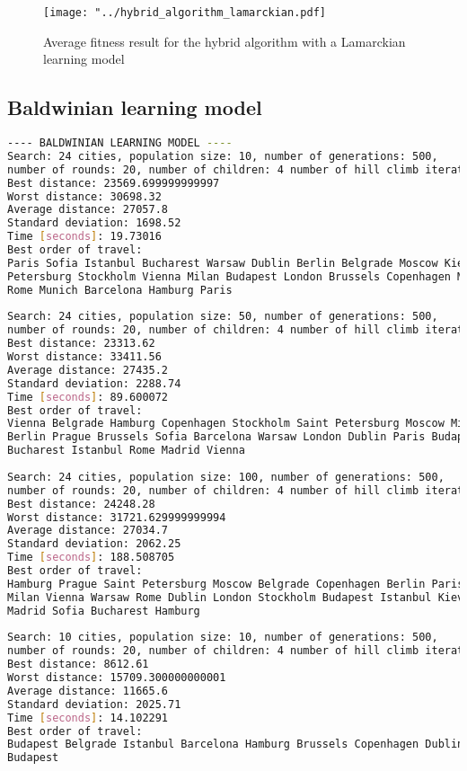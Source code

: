 \documentclass{article}
\begin{document}
\begin{figure}[H]
\begin{center}
\texttt{[image: "../hybrid\_algorithm\_lamarckian.pdf]}
\caption{Average fitness result for the hybrid algorithm with a Lamarckian learning model}
\end{center}
\end{figure}

\subsection{Baldwinian learning model}
\begin{lstlisting}[language=bash]
---- BALDWINIAN LEARNING MODEL ----
Search: 24 cities, population size: 10, number of generations: 500, 
number of rounds: 20, number of children: 4 number of hill climb iterations: 3: 
Best distance: 23569.699999999997
Worst distance: 30698.32
Average distance: 27057.8
Standard deviation: 1698.52
Time [seconds]: 19.73016
Best order of travel: 
Paris Sofia Istanbul Bucharest Warsaw Dublin Berlin Belgrade Moscow Kiev Saint 
Petersburg Stockholm Vienna Milan Budapest London Brussels Copenhagen Madrid 
Rome Munich Barcelona Hamburg Paris
 
Search: 24 cities, population size: 50, number of generations: 500, 
number of rounds: 20, number of children: 4 number of hill climb iterations: 3: 
Best distance: 23313.62
Worst distance: 33411.56
Average distance: 27435.2
Standard deviation: 2288.74
Time [seconds]: 89.600072
Best order of travel: 
Vienna Belgrade Hamburg Copenhagen Stockholm Saint Petersburg Moscow Milan Kiev 
Berlin Prague Brussels Sofia Barcelona Warsaw London Dublin Paris Budapest 
Bucharest Istanbul Rome Madrid Vienna
 
Search: 24 cities, population size: 100, number of generations: 500, 
number of rounds: 20, number of children: 4 number of hill climb iterations: 3: 
Best distance: 24248.28
Worst distance: 31721.629999999994
Average distance: 27034.7
Standard deviation: 2062.25
Time [seconds]: 188.508705
Best order of travel: 
Hamburg Prague Saint Petersburg Moscow Belgrade Copenhagen Berlin Paris Brussels 
Milan Vienna Warsaw Rome Dublin London Stockholm Budapest Istanbul Kiev Barcelona 
Madrid Sofia Bucharest Hamburg
 
Search: 10 cities, population size: 10, number of generations: 500, 
number of rounds: 20, number of children: 4 number of hill climb iterations: 3: 
Best distance: 8612.61
Worst distance: 15709.300000000001
Average distance: 11665.6
Standard deviation: 2025.71
Time [seconds]: 14.102291
Best order of travel: 
Budapest Belgrade Istanbul Barcelona Hamburg Brussels Copenhagen Dublin Berlin 
Budapest
 

\end{lstlisting}
\end{document}
